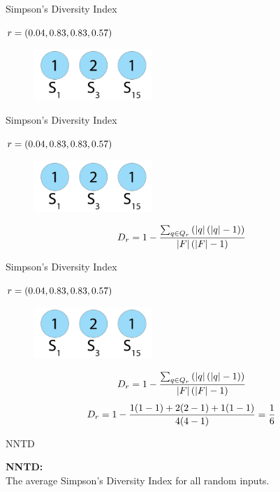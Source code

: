 \begin{frame}{Simpson's Diversity Index}
\begin{center}
$r = (0.04, 0.83, 0.83, 0.57)$
  \begin{figure}[p]
  \includegraphics[width=0.4\textwidth]{images/speciessize.png}
  \end{figure}
\end{center}
\end{frame}

\begin{frame}{Simpson's Diversity Index}
\begin{center}
$r = (0.04, 0.83, 0.83, 0.57)$
  \begin{figure}[p]
  \includegraphics[width=0.4\textwidth]{images/speciessize.png}
  \end{figure}
\begin{equation}
D_{r} = 1 - \frac{\sum_{q \in Q_{r}}\left(\lvert q\rvert\left(\lvert q\rvert - 1\right)\right)}{\lvert F\rvert\left(\lvert F\rvert - 1\right)}
\end{equation}
\end{center}
\end{frame}

\begin{frame}{Simpson's Diversity Index}
\begin{center}
$r = (0.04, 0.83, 0.83, 0.57)$
  \begin{figure}[p]
  \includegraphics[width=0.4\textwidth]{images/speciessize.png}
  \end{figure}
\begin{equation}
D_{r} = 1 - \frac{\sum_{q \in Q_{r}}\left(\lvert q\rvert\left(\lvert q\rvert - 1\right)\right)}{\lvert F\rvert\left(\lvert F\rvert - 1\right)}
\end{equation}
\begin{equation}\label{eq:nntd}
D_{r} = 1 - \frac{1(1-1)+2(2-1)+1(1-1)}{4(4-1)} = \frac{1}{6}
\end{equation}
\end{center}
\end{frame}

\begin{frame}{NNTD}
\begin{center}
\textbf{NNTD:}\\
The average Simpson's Diversity Index for all random inputs.
\end{center}
\end{frame}





